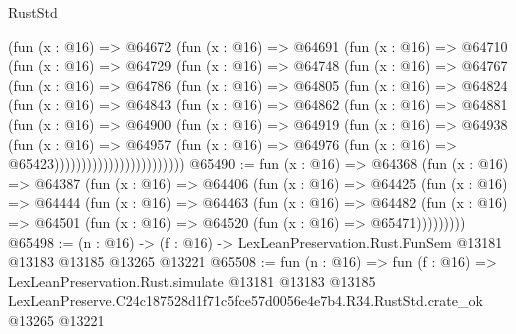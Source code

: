 \begin{lexlean}{RustStd}
\begin{coremodule}
                (fun (x : @16) =>
                @64672
                  (fun (x : @16) =>
                  @64691
                    (fun (x : @16) =>
                    @64710
                      (fun (x : @16) =>
                      @64729
                        (fun (x : @16) =>
                        @64748
                          (fun (x : @16) =>
                          @64767
                            (fun (x : @16) =>
                            @64786
                              (fun (x : @16) =>
                              @64805
                                (fun (x : @16) =>
                                @64824
                                  (fun (x : @16) =>
                                  @64843
                                    (fun (x : @16) =>
                                    @64862
                                      (fun (x : @16) =>
                                      @64881
                                        (fun (x : @16) =>
                                        @64900
                                          (fun (x : @16) =>
                                          @64919
                                            (fun (x : @16) =>
                                            @64938
                                              (fun (x : @16) =>
                                              @64957
                                                (fun (x : @16) =>
                                                @64976
                                                  (fun (x : @16) => @65423))))))))))))))))))))))))
@65490 := fun (x : @16) =>
  @64368
    (fun (x : @16) =>
    @64387
      (fun (x : @16) =>
      @64406
        (fun (x : @16) =>
        @64425
          (fun (x : @16) =>
          @64444
            (fun (x : @16) =>
            @64463
              (fun (x : @16) =>
              @64482
                (fun (x : @16) => @64501 (fun (x : @16) => @64520 (fun (x : @16) => @65471)))))))))
@65498 := (n : @16) ->
  (f : @16) -> LexLeanPreservation.Rust.FunSem @13181 @13183 @13185 @13265 @13221
@65508 := fun (n : @16) =>
  fun (f : @16) =>
  LexLeanPreservation.Rust.simulate
    @13181
    @13183
    @13185
    LexLeanPreserve.C24c187528d1f71c5fce57d0056e4e7b4.R34.RustStd.crate_ok
    @13265
    @13221
\end{coremodule}
\end{lexlean}
